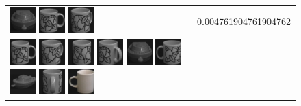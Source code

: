 {\begin{figure}[p]
\begin{tabular}{m{11cm} | m{3cm} |}
\includegraphics[width=1cm]{coil/beeld-26.eps}
\includegraphics[width=1cm]{coil/beeld-48.eps}
\includegraphics[width=1cm]{coil/beeld-51.eps}
& {\scriptsize 0.004761904761904762}
\\
\includegraphics[width=1cm]{coil/beeld-48.eps}
\includegraphics[width=1cm]{coil/beeld-51.eps}
\includegraphics[width=1cm]{coil/beeld-50.eps}
\includegraphics[width=1cm]{coil/beeld-52.eps}
\includegraphics[width=1cm]{coil/beeld-26.eps}
\includegraphics[width=1cm]{coil/beeld-49.eps}
\includegraphics[width=1cm]{coil/beeld-27.eps}
\includegraphics[width=1cm]{coil/beeld-53.eps}
\includegraphics[width=1cm]{coil/beeld-37.eps}

\end{tabular}
\end{figure}}
